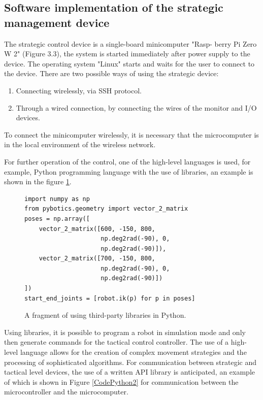 \subsection{Software implementation of the strategic management device}
The strategic control device is a single-board minicomputer "Rasp- berry Pi Zero W 2" (Figure 3.3), the system is started immediately after power supply to the device. The operating system "Linux" starts and waits for the user to connect to the device. There are two possible ways of using the strategic device:

\begin{enumerate}
	\item Connecting wirelessly, via SSH protocol.
	\item Through a wired connection, by connecting the wires of the monitor and I/O devices.
\end{enumerate}
To connect the minicomputer wirelessly, it is necessary that the microcomputer is in the local environment of the wireless network.

For further operation of the control, one of the high-level languages is used, for example, Python programming language with the use of libraries, an example is shown in the figure \ref{CodePython1}.
\begin{figure}[H]
	\centering

	\begin{verbatim}
import numpy as np
from pybotics.geometry import vector_2_matrix
poses = np.array([
    vector_2_matrix([600, -150, 800,
                     np.deg2rad(-90), 0,
                     np.deg2rad(-90)]),
    vector_2_matrix([700, -150, 800,
                     np.deg2rad(-90), 0,
                     np.deg2rad(-90)])
])
start_end_joints = [robot.ik(p) for p in poses]
	\end{verbatim}
	\caption{A fragment of using third-party libraries in Python.}\label{CodePython1}
\end{figure}

Using libraries, it is possible to program a robot in simulation mode and only then generate commands for the tactical control controller. The use of a high-level language allows for the creation of complex movement strategies and the processing of sophisticated algorithms. For communication between strategic and tactical level devices, the use of a written API library is anticipated, an example of which is shown in Figure \ref{CodePython2} for communication between the microcontroller and the microcomputer.


